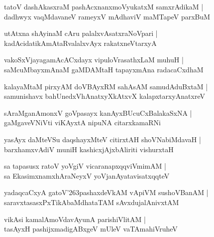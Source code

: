 \documentclass[twoside,12pt,openright]{book}
\def\S{\char'263}
\newcounter{shloka}[chapter]
\begin{document}
\begin{shloka}%
tatoV dashAkasxraM pashAcxnanxmoVyukatxM samxrAdikaM |\\
dadhwyx vaqMdavaneV rameyxV mAdhaviV maMTapeV parxBuM 
\end{shloka}

\begin{shloka}%
utAtxna shAyinaM cAru palalxvAsatxraNoVpari |\\
kadAcidatikAmAtaRvalalxvAyx rakatxneVtarxyA 
\end{shloka}

\begin{shloka}%
vakoSxVjayagamAcACxdayx vipuloVrasathxLaM muhuH |\\
saMcuMbayxmAnaM gaMDAMtaH tapayxmAna radacaCxdhaM 
\end{shloka}

\begin{shloka}%
kalayaMtaM pirxyAM doVBAyxRM sahAsAM samudAduBxtaM |\\
samunishavx bahUnedxVhAnatxyXkAtxvX kalapxtarxyAnatxreV 
\end{shloka}

\begin{shloka}%
sAraMganAmonxV goVpasayx kanAyxBUcuCxBalakaSxNA |\\
gaMgaveVNiVti viKAyxtA nipuNA citarxkamaRNi
\end{shloka}

\begin{shloka}%
yasAyx daMteVSu daqshayxMteV citirxtAH shoVNabiMdavaH |\\
barxhamxvAdiV muniH kashicxjAjxbAliriti vishurxtaH 
\end{shloka}

\begin{shloka}%
sa tapasusx ratoV yoVgiV vicaranapxqqviVmimAM |\\
sa EkasimxnamxhAraNeyxV yoVjanAyatavisatxqqteV 
\end{shloka}

\begin{shloka}%
yadaqcaCxyA gatoV\S pashaxdeVkAM vApiVM sushoVBanAM |\\
saravxtasasxPxTikAbaMdhataTAM sAvxdujalAnivxtAM 
\end{shloka}

\begin{shloka}%
vikAsi kamalAmoVdavAyunA parishiVlitAM |\\
tasAyxH pashijxmadigABxgeV mUleV vaTAmahiVruheV 
\end{shloka}
\end{document}
